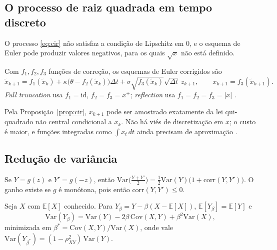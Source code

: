 \subsection{O processo de raiz quadrada em tempo discreto}

O processo \eqref{eq:cir} não satisfaz a condição de Lipschitz em $0$, e o esquema de Euler pode produzir valores negativos, para os quais $\sqrt{x}$ não está definido.

\begin{definicao}
Com $f_1,f_2,f_3$ funções de correção, os esquemas de Euler corrigidos são
\begin{equation}
\tilde x_{k+1}=f_1(\tilde x_k)+\kappa\big(\theta-f_2(\tilde x_k)\big)\Delta t+\sigma\sqrt{f_3(\tilde x_k)}\sqrt{\Delta t}\,z_{k+1},\qquad x_{k+1}=f_3(\tilde x_{k+1}).
\end{equation}
\emph{Full truncation} usa $f_1=\mathrm{id}$, $f_2=f_3=x^+$; \emph{reflection} usa $f_1=f_2=f_3=|x|$ \citep{lordetal2010}.
\end{definicao}

\begin{proposicao}
Pela Proposição~\ref{prop:cir}, $x_{k+1}$ pode ser amostrado exatamente da lei qui-quadrado não central condicional a $x_k$. Não há viés de discretização em $x$; o custo é maior, e funções integradas como $\int x_t\,dt$ ainda precisam de aproximação \citep{broadiekaya2006,andersen2008}.
\end{proposicao}

\subsection{Redução de variância}

\begin{proposicao}
Se $Y=g(z)$ e $Y'=g(-z)$, então $\mathrm{Var}\big(\tfrac{Y+Y'}2\big)=\tfrac12\mathrm{Var}(Y)\big(1+\mathrm{corr}(Y,Y')\big)$. O ganho existe se $g$ é monótona, pois então $\mathrm{corr}(Y,Y')\le0$.
\end{proposicao}

\begin{proposicao}\label{prop:cv}
Seja $X$ com $\mathbb E[X]$ conhecido. Para $Y_\beta=Y-\beta(X-\mathbb E[X])$, $\mathbb E[Y_\beta]=\mathbb E[Y]$ e
\begin{equation}
\mathrm{Var}(Y_\beta)=\mathrm{Var}(Y)-2\beta\,\mathrm{Cov}(X,Y)+\beta^2\mathrm{Var}(X),
\end{equation}
minimizada em $\beta^*=\mathrm{Cov}(X,Y)/\mathrm{Var}(X)$, onde vale $\mathrm{Var}(Y_{\beta^*})=(1-\rho_{XY}^2)\,\mathrm{Var}(Y)$.
\end{proposicao}

